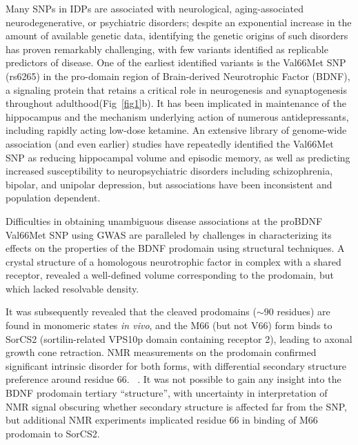 \documentclass[10pt,letterpaper]{article}
\begin{document}
Many SNPs in IDPs are associated with neurological, aging-associated neurodegenerative, or psychiatric disorders; despite an exponential increase in the amount of available genetic data, identifying the genetic origins of such disorders has proven remarkably challenging, with few variants identified as replicable predictors of disease.  %
One of the earliest identified variants is the Val66Met SNP (rs6265)  in the pro-domain region of Brain-derived Neurotrophic Factor (BDNF), \cite{Notaras2015} a signaling protein %
that retains a critical role in neurogenesis and synaptogenesis throughout adulthood(Fig~\ref{fig1}b).\cite{Korte1995} It has been implicated in maintenance of the hippocampus and the mechanism underlying action of numerous antidepressants, \cite{Autry2012,Bjoerkholm2016} %
including rapidly acting low-dose ketamine.\cite{Autry2011}  An extensive library of genome-wide association (and even earlier) studies have repeatedly identified the Val66Met SNP as reducing hippocampal volume and episodic memory, as well as predicting increased susceptibility to neuropsychiatric disorders including schizophrenia, bipolar, and unipolar depression, but associations have been inconsistent and population dependent. \cite{soliman2010,Chen2008,Verhagen2010,Notaras2015, Autry2011} 

Difficulties in obtaining unambiguous disease associations at the proBDNF Val66Met SNP using GWAS are paralleled by challenges in characterizing its effects on the properties of the BDNF prodomain using structural techniques.  A crystal structure of a homologous neurotrophic factor in complex with a shared receptor, revealed a well-defined volume corresponding to the prodomain, but which lacked resolvable density.\cite{Feng2010a} 

It was subsequently revealed that the cleaved prodomains ($\sim90$ residues) are found in monomeric states {\it in vivo}, and the M66 (but not V66) form binds to SorCS2 (sortilin-related VPS10p domain containing receptor 2), leading to axonal growth cone retraction.\cite{Anastasia2013} NMR measurements on the prodomain confirmed significant intrinsic disorder for both forms, with differential secondary structure preference around residue 66. ~\cite {Anastasia2013}.  It was not possible to gain any insight into the BDNF prodomain tertiary ``structure'', with uncertainty in interpretation of NMR signal obscuring whether secondary structure is affected far from the SNP, but additional NMR experiments implicated residue 66 in binding of M66 prodomain 
 to SorCS2.~\cite {Anastasia2013}
\end{document}
